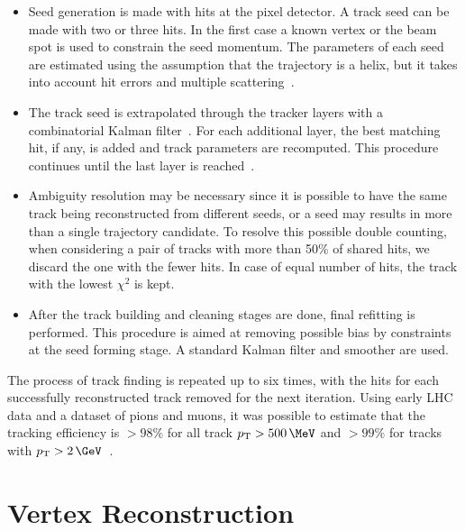 \begin{itemize}
  \item Seed generation is made with hits at the pixel detector. A track seed can be made with two or three hits. In the first case a known vertex or the beam spot is used to constrain the seed momentum. The parameters of each seed are estimated using the assumption that the trajectory is a helix, but it takes into account hit errors and multiple scattering~\cite{ARTICLE:CMSTrackReconstructionSeedGeneration}.
  \item The track seed is extrapolated through the tracker layers with a combinatorial Kalman filter~\cite{ARTICLE:KalmanFilteringTrackVertexFitting}. For each additional layer, the best matching hit, if any, is added and track parameters are recomputed. This procedure continues until the last layer is reached~\cite{ARTICLE:CMSTrackReconstruction}.
  \item Ambiguity resolution may be necessary since it is possible to have the same track being reconstructed from different seeds, or a seed may results in more than a single trajectory candidate. To resolve this possible double counting, when considering a pair of tracks with more than 50\% of shared hits, we discard the one with the fewer hits. In case of equal number of hits, the track with the lowest $\chi^2$ is kept. 
  \item After the track building and cleaning stages are done, final refitting is performed. This procedure is aimed at removing possible bias by constraints at the seed forming stage. A standard Kalman filter and smoother are used.
\end{itemize}

The process of track finding is repeated up to six times, with the hits for each successfully reconstructed track removed for the next iteration. Using early \gls{LHC} data and a dataset of pions and muons, it was possible to estimate that the tracking efficiency is $>98\%$ for all track $\pt > 500\,\MeV$ and $>99\%$ for tracks with $\pt>2\,\GeV$~\cite{ARTICLE:CMSMeasurmentTrackEfficiency}.

\section{Vertex Reconstruction}
\label{SECTION:EventReconstructionAndSimulation_Vertex}

